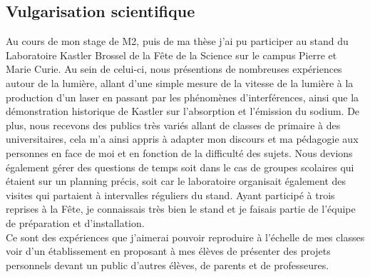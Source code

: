 \documentclass[a4paper,11pt]{article} %
\newcommand{\pointmedian}{\fontfamily{cmr}\selectfont\textperiodcentered}
\begin{document}
	
	\subsection{Vulgarisation scientifique}
	Au cours de mon stage de M2, puis de ma thèse j'ai pu participer au stand du Laboratoire Kastler Brossel de la Fête de la Science sur le campus Pierre et Marie Curie. Au sein de celui-ci, nous présentions de nombreuses expériences autour de la lumière, allant d'une \textgravedbl simple\textacutedbl{} mesure de la vitesse de la lumière à la production d'un laser en passant par les phénomènes d'interférences, ainsi que la démonstration historique de Kastler sur l'absorption et l'émission du sodium. De plus, nous recevons des publics très variés allant de classes de primaire à des universitaires, cela m'a ainsi appris à adapter mon discours et ma pédagogie aux personnes en face de moi et en fonction de la difficulté des sujets. Nous devions également gérer des questions de temps soit dans le cas de groupes scolaires qui étaient sur un planning précis, soit car le laboratoire organisait également des visites qui partaient à intervalles réguliers du stand. Ayant participé à trois reprises à la Fête, je connaissais très bien le stand et je faisais partie de l'équipe de préparation et d'installation.\\
	
	Ce sont des expériences que j'aimerai pouvoir reproduire à l'échelle de mes classes voir d'un établissement en proposant à mes élèves de présenter des projets personnels devant un public d'autres élèves, de parents et de professeur\pointmedian es.
	
\end{document}
